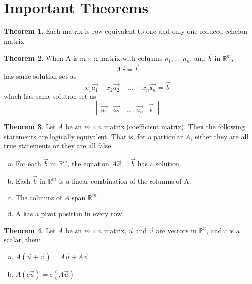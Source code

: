 \documentclass[a4paper,12pt]{article}
\theoremstyle{definition}
\newtheorem{theorem}{Theorem}
\theoremstyle{definition}
\newcommand{\mateq}[3]{#1#2 = #3}
\newcommand{\mateqaxb}{\mateq{A}{\vec{x}}{\vec{b}}}
\begin{document}
	\section{Important Theorems}
	\begin{theorem}
		Each matrix is row equivalent to one and only one reduced echelon matrix.
	\end{theorem}
	
	\begin{theorem}
		\label{thm:A-x-b-thm}
		When A is $m \times n$ matrix with columns $a_1,\ldots,a_n$, and $\vec{b}$ in $\mathbb{R}^m$,
		\begin{equation*}
			\mateqaxb
		\end{equation*}
		has same solution set as
		\begin{equation*}
			x_1\vec{a_1} + x_2\vec{a_2} + \ldots + x_n\vec{a_n} = \vec{b}
		\end{equation*}
		which has same solution set as 
		\begin{equation*}
			\begin{bmatrix}
				\vec{a_1} & \vec{a_2} & \ldots & \vec{a_n} & \vec{b}
			\end{bmatrix}
		\end{equation*}
	\end{theorem}
	
	\begin{theorem}
		\label{thm:A-x-b-relation-thm}
		Let $A$ be an $m \times n$ matrix (coefficient matrix). Then the following statements are logically equivalent.
		That is, for a particular $A$, either they are all true statements or they are all false.
		\begin{enumerate}[a.]
			\item For each $\vec{b}$ in $\mathbb{R} ^ m$, the equation $A\vec{x} = \vec{b}$ has a solution.
			
			\item Each $\vec{b}$ in $\mathbb{R} ^ m$ is a linear combination of the columns of A.
			
			\item The columns of $A$ span $\mathbb{R} ^ m$.
			
			\item A has a pivot position in every row.
		\end{enumerate}
	\end{theorem}
	
	\begin{theorem}
		\label{thm:A-x-b-props}
		Let $A$ be an $m \times n$ matrix, $\vec{u}$ and $\vec{v}$ are vectors in $\mathbb{R}^n$, and $c$ is a scalar, then:
		
		\begin{enumerate}[a.]
			\item $A(\vec{u} + \vec{v}) = A\vec{u} + A\vec{v}$
			
			\item $A(c\vec{u}) = c(A\vec{u})$
		\end{enumerate}
	\end{theorem}
	
\end{document}
